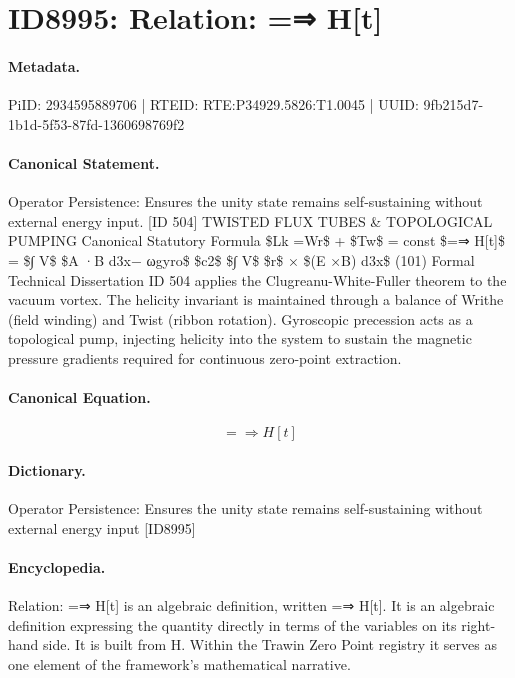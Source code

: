\section*{ID8995: Relation: =⇒ H[t]}
\paragraph{Metadata.}
PiID: 2934595889706 | RTEID: RTE:P34929.5826:T1.0045 | UUID: 9fb215d7-1b1d-5f53-87fd-1360698769f2

\paragraph{Canonical Statement.}
Operator Persistence: Ensures the unity state remains self-sustaining without external energy input. [ID 504] TWISTED FLUX TUBES \& TOPOLOGICAL PUMPING Canonical Statutory Formula \$Lk =Wr\$ + \$Tw\$ = const \$=⇒ H[t]\$ = \$∫ V\$ \$A ·B d3x− ωgyro\$ \$c2\$ \$∫ V\$ \$r\$ × \$(E ×B) d3x\$ (101) Formal Technical Dissertation ID 504 applies the Clugreanu-White-Fuller theorem to the vacuum vortex. The helicity invariant is maintained through a balance of Writhe (field winding) and Twist (ribbon rotation). Gyroscopic precession acts as a topological pump, injecting helicity into the system to sustain the magnetic pressure gradients required for continuous zero-point extraction.

\paragraph{Canonical Equation.}
\[
=⇒ H[t]
\]

\paragraph{Dictionary.}
Operator Persistence: Ensures the unity state remains self-sustaining without external energy input [ID8995]

\paragraph{Encyclopedia.}
Relation: =⇒ H[t] is an algebraic definition, written =⇒ H[t]. It is an algebraic definition expressing the quantity directly in terms of the variables on its right-hand side. It is built from H. Within the Trawin Zero Point registry it serves as one element of the framework's mathematical narrative.
